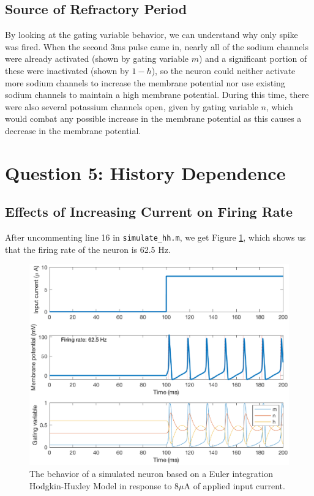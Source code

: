 \documentclass[11pt, oneside]{article}
\begin{document}
\subsection{Source of Refractory Period}
By looking at the gating variable behavior, we can understand why only spike was fired. When the second 3ms pulse came in, nearly all of the sodium channels were already activated (shown by gating variable $m$) and a significant portion of these were inactivated (shown by $1-h$), so the neuron could neither activate more sodium channels to increase the membrane potential nor use existing sodium channels to maintain a high membrane potential. During this time, there were also several potassium channels open, given by gating variable $n$, which would combat any possible increase in the membrane potential as this causes a decrease in the membrane potential.

\section{Question 5: History Dependence}

\subsection{Effects of Increasing Current on Firing Rate}

After uncommenting line 16 in \lstinline{simulate_hh.m}, we get Figure \ref{fig:8ma_stim}, which shows us that the firing rate of the neuron is 62.5 Hz.

\begin{figure}[ht!]
\centering
\includegraphics[width=1\textwidth]{8ma_stim.eps}
\caption{The behavior of a simulated neuron based on a Euler integration Hodgkin-Huxley Model in response to 8$\mu$A of applied input current.}
\label{fig:8ma_stim}
\end{figure}
\end{document}
